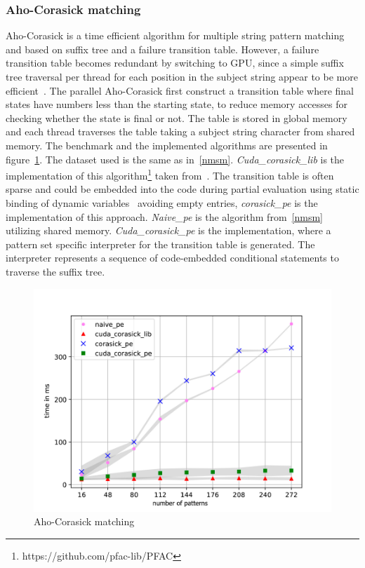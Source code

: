 \subsubsection{Aho-Corasick matching}
Aho-Corasick is a time efficient algorithm for multiple string pattern matching~\cite{Aho-Corasick} and based on suffix tree and a failure transition table. However, a failure transition table becomes redundant by switching to GPU, since a simple suffix tree traversal per thread for each position in the subject string appear to be more efficient~\cite{PFAC}. The parallel Aho-Corasick first construct a transition table where final states have numbers less than the starting state, to reduce memory accesses for checking whether the state is final or not. The table is stored in global memory and each thread traverses the table taking a subject string character from shared memory. The benchmark and the implemented algorithms are presented in figure~\ref{fig:my_corasick}. The dataset used is the same as in~\ref{nmsm}. \emph{Cuda\_corasick\_lib} is the implementation of this algorithm\footnote{https://github.com/pfac-lib/PFAC} taken from~\cite{PFAC}. The transition table is often sparse and could be embedded into the code during partial evaluation using static binding of dynamic variables~\cite{Jones1993} avoiding empty entries, \emph{corasick\_pe} is the implementation of this approach. \emph{Naive\_pe} is the algorithm from~\ref{nmsm} utilizing shared memory. \emph{Cuda\_corasick\_pe} is the implementation, where a pattern set specific interpreter for the transition table is generated. The interpreter represents a sequence of code-embedded conditional statements to traverse the suffix tree.


\begin{figure}[h!]
    \centering
    \includegraphics{figures/PredDefendNaiveSearchorasick(eng).pdf}
    \caption{Aho-Corasick matching}
    \label{fig:my_corasick}
\end{figure}


